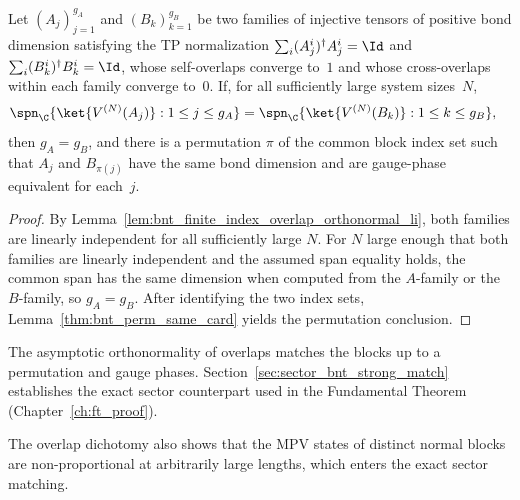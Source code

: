 \begin{lemma}\label{lem:bnt_perm_simple}
    \leanok
    Let $(A_j)_{j=1}^{g_A}$ and $(B_k)_{k=1}^{g_B}$ be two
    families of injective tensors of positive bond dimension satisfying the TP normalization
    $\sum_i (A_j^i)^\dagger A_j^i = \Id$ and
    $\sum_i (B_k^i)^\dagger B_k^i = \Id$, whose self-overlaps
    converge to~$1$ and whose cross-overlaps within each
    family converge to~$0$.
    If, for all sufficiently large system sizes~$N$,
    \begin{align}
        \spn_{\C}\{\ket{V^{(N)}(A_j)} : 1 \le j \le g_A\}
         & =
        \spn_{\C}\{\ket{V^{(N)}(B_k)} : 1 \le k \le g_B\}, \notag
    \end{align}
    then $g_A = g_B$, and there is a permutation $\pi$ of the common
    block index set such that $A_j$ and $B_{\pi(j)}$ have the same bond
    dimension and are gauge-phase equivalent for each~$j$.
\end{lemma}

\begin{proof}\leanok{}
    By Lemma~\ref{lem:bnt_finite_index_overlap_orthonormal_li}, both families are
    linearly independent for all sufficiently large $N$. For $N$ large
    enough that both families are linearly independent and the assumed span
    equality holds, the common span has the same dimension when computed
    from the $A$-family or the $B$-family, so $g_A = g_B$. After identifying
    the two index sets, Lemma~\ref{thm:bnt_perm_same_card} yields the
    permutation conclusion.
\end{proof}

The asymptotic orthonormality of overlaps matches the blocks up to a
permutation and gauge phases. Section~\ref{sec:sector_bnt_strong_match}
establishes the exact sector counterpart used in the Fundamental Theorem
(Chapter~\ref{ch:ft_proof}).

The overlap dichotomy also shows that the MPV states of distinct normal
blocks are non-proportional at arbitrarily large lengths, which enters the
exact sector matching.

